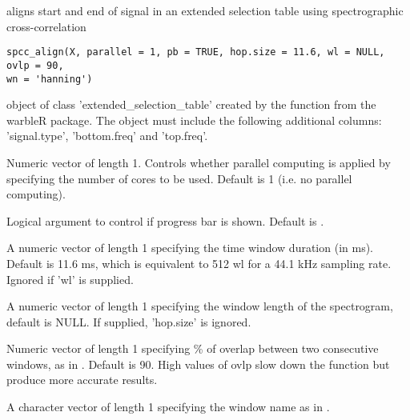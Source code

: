 \documentclass[letterpaper]{book}
\begin{document}
%
\begin{Description}\relax
{} aligns start and end of signal in an extended selection table using spectrographic cross-correlation
\end{Description}
%
\begin{Usage}
\begin{verbatim}
spcc_align(X, parallel = 1, pb = TRUE, hop.size = 11.6, wl = NULL, ovlp = 90, 
wn = 'hanning')
\end{verbatim}
\end{Usage}
%
\begin{Arguments}
\begin{ldescription}
\item[\code{X}] object of class 'extended\_selection\_table' created by the function  from the warbleR package. The object must include the following additional columns: 'signal.type', 'bottom.freq' and 'top.freq'.

\item[\code{parallel}] Numeric vector of length 1. Controls whether parallel computing is applied by specifying the number of cores to be used. Default is 1 (i.e. no parallel computing).

\item[\code{pb}] Logical argument to control if progress bar is shown. Default is .

\item[\code{hop.size}] A numeric vector of length 1 specifying the time window duration (in ms). Default is 11.6 ms, which is equivalent to 512 wl for a 44.1 kHz sampling rate. Ignored if 'wl' is supplied.

\item[\code{wl}] A numeric vector of length 1 specifying the window length of the spectrogram, default 
is NULL. If supplied, 'hop.size' is ignored.

\item[\code{ovlp}] Numeric vector of length 1 specifying \% of overlap between two 
consecutive windows, as in . Default is 90. High values of ovlp 
slow down the function but produce more accurate results.

\item[\code{wn}] A character vector of length 1 specifying the window name as in .
\end{ldescription}
\end{Arguments}
\end{document}
